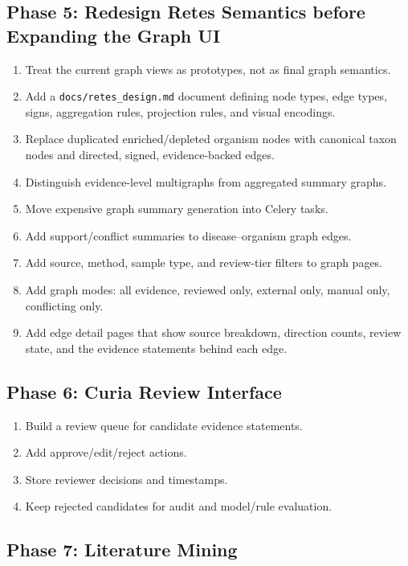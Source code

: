 \documentclass[11pt,a4paper]{article}
\begin{document}
\subsection{Phase 5: Redesign Retes Semantics before Expanding the Graph UI}

\begin{enumerate}[noitemsep]
    \item Treat the current graph views as prototypes, not as final graph semantics.
    \item Add a \texttt{docs/retes\_design.md} document defining node types, edge types, signs, aggregation rules, projection rules, and visual encodings.
    \item Replace duplicated enriched/depleted organism nodes with canonical taxon nodes and directed, signed, evidence-backed edges.
    \item Distinguish evidence-level multigraphs from aggregated summary graphs.
    \item Move expensive graph summary generation into Celery tasks.
    \item Add support/conflict summaries to disease--organism graph edges.
    \item Add source, method, sample type, and review-tier filters to graph pages.
    \item Add graph modes: all evidence, reviewed only, external only, manual only, conflicting only.
    \item Add edge detail pages that show source breakdown, direction counts, review state, and the evidence statements behind each edge.
\end{enumerate}

\subsection{Phase 6: Curia Review Interface}

\begin{enumerate}[noitemsep]
    \item Build a review queue for candidate evidence statements.
    \item Add approve/edit/reject actions.
    \item Store reviewer decisions and timestamps.
    \item Keep rejected candidates for audit and model/rule evaluation.
\end{enumerate}

\subsection{Phase 7: Literature Mining}
\end{document}
